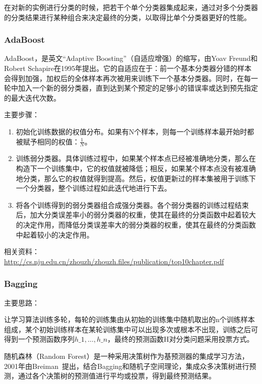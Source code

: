 \documentclass[12pt]{article}
\begin{document}
在对新的实例进行分类的时候，把若干个单个分类器集成起来，通过对多个分类器的分类结果进行某种组合来决定最终的分类，以取得比单个分类器更好的性能。

\subsubsection{AdaBoost}

AdaBoost，是英文``Adaptive Boosting''（自适应增强）的缩写，由Yoav Freund和Robert Schapire在1995年提出。它的自适应在于：前一个基本分类器分错的样本会得到加强，加权后的全体样本再次被用来训练下一个基本分类器。同时，在每一轮中加入一个新的弱分类器，直到达到某个预定的足够小的错误率或达到预先指定的最大迭代次数。

{\color{blue}主要步骤}：
\begin{enumerate}
    \item 初始化训练数据的权值分布。如果有N个样本，则每一个训练样本最开始时都被赋予相同的权值：$\frac{1}{N}$。
    \item 训练弱分类器。具体训练过程中，如果某个样本点已经被准确地分类，那么在构造下一个训练集中，它的权值就被降低；相反，如果某个样本点没有被准确地分类，那么它的权值就得到提高。然后，权值更新过的样本集被用于训练下一个分类器，整个训练过程如此迭代地进行下去。
    \item 将各个训练得到的弱分类器组合成强分类器。各个弱分类器的训练过程结束后，加大分类误差率小的弱分类器的权重，使其在最终的分类函数中起着较大的决定作用，而降低分类误差率大的弱分类器的权重，使其在最终的分类函数中起着较小的决定作用。
\end{enumerate}

相关资料：\url{http://cs.nju.edu.cn/zhouzh/zhouzh.files/publication/top10chapter.pdf}

\subsubsection{Bagging}

{\color{blue}主要思路}：

让学习算法训练多轮，每轮的训练集由从初始的训练集中随机取出的n个训练样本组成，某个初始训练样本在某轮训练集中可以出现多次或根本不出现，训练之后可得到一个预测函数序列$h\_1, \dots, h\_n$，最终的预测函数H对分类问题采用投票方式。

随机森林（Random Forest）是一种采用决策树作为基预测器的集成学习方法，2001年由Breiman~\cite{breiman2001random}提出，结合Bagging和随机子空间理论，集成众多决策树进行预测，通过各个决策树的预测值进行平均或投票，得到最终预测结果。
\end{document}
